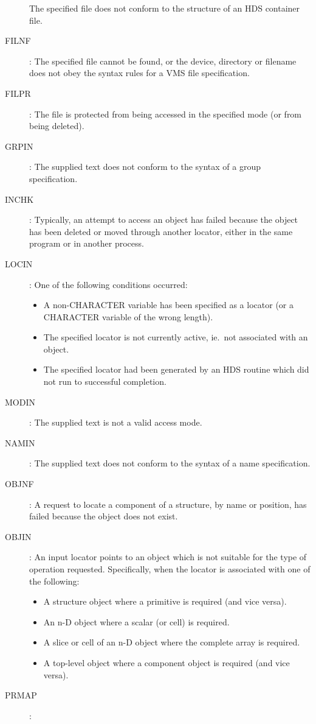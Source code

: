 \begin{description}
The specified file does not conform to the structure of an HDS container file.
\item [FILNF]:
The specified file cannot be found, or the device, directory or filename does
not obey the syntax rules for a VMS file specification.
\item [FILPR]:
The file is protected from being accessed in the specified mode (or from being
deleted).
\item [GRPIN]:
The supplied text does not conform to the syntax of a group specification.
\item [INCHK]:
Typically, an attempt to access an object has failed because the object has been
deleted or moved through another locator, either in the same program or in
another process.
\item [LOCIN]:
One of the following conditions occurred:
\begin{itemize}
\item A non-CHARACTER variable has been specified as a locator (or a CHARACTER
variable of the wrong length).
\item The specified locator is not currently active, ie.\ not associated with an
object.
\item The specified locator had been generated by an HDS routine which did not
run to successful completion.
\end{itemize}
\item [MODIN]:
The supplied text is not a valid access mode.
\item [NAMIN]:
The supplied text does not conform to the syntax of a name specification.
\item [OBJNF]:
A request to locate a component of a structure, by name or position, has failed
because the object does not exist.
\item [OBJIN]:
An input locator points to an object which is not suitable for the type of
operation requested.
Specifically, when the locator is associated with one of the following:
\begin{itemize}
\item A structure object where a primitive is required (and vice versa).
\item An n-D object where a scalar (or cell) is required.
\item A slice or cell of an n-D object where the complete array is required.
\item A top-level object where a component object is required (and vice versa).
\end{itemize}
\item [PRMAP]:

\end{description}

